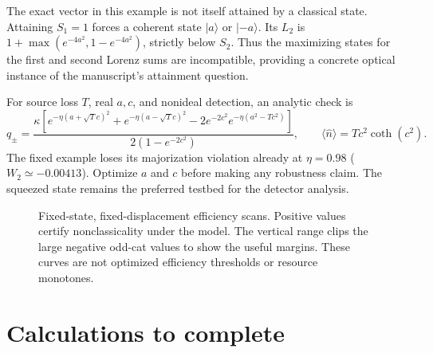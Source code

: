 \documentclass[11pt,a4paper]{article}
\newcommand{\nbar}{\bar n_{\max}}
\newcommand{\ket}[1]{\lvert #1\rangle}
\begin{document}
The exact vector in this example is not itself attained by a classical state.
Attaining $S_1=1$ forces a coherent state $\ket{a}$ or $\ket{-a}$.
Its $L_2$ is $1+\max(e^{-4a^2},1-e^{-4a^2})$, strictly below $S_2$.
Thus the maximizing states for the first and second Lorenz sums are incompatible,
providing a concrete optical instance of the manuscript's attainment question.

For source loss $T$, real $a,c$, and nonideal detection, an analytic check is
\begin{equation}
 q_\pm=\frac{\kappa\left[
 e^{-\eta(a+\sqrt T c)^2}+e^{-\eta(a-\sqrt T c)^2}
 -2e^{-2c^2}e^{-\eta(a^2-Tc^2)}\right]}
 {2(1-e^{-2c^2})},\qquad \langle\hat n\rangle=Tc^2\coth(c^2).
 \label{eq:catloss}
\end{equation}
The fixed example loses its majorization violation already at $\eta=0.98$
($W_2\simeq-0.00413$). Optimize $a$ and $c$ before making any robustness claim.
The squeezed state remains the preferred testbed for the detector analysis.

\begin{figure}[htbp]
\centering
{}
\caption{Fixed-state, fixed-displacement efficiency scans. Positive values certify
nonclassicality under the model. The vertical range clips the large negative
odd-cat values to show the useful margins. These curves are not optimized
efficiency thresholds or resource monotones.}
\end{figure}

\section{Calculations to complete}
\end{document}

